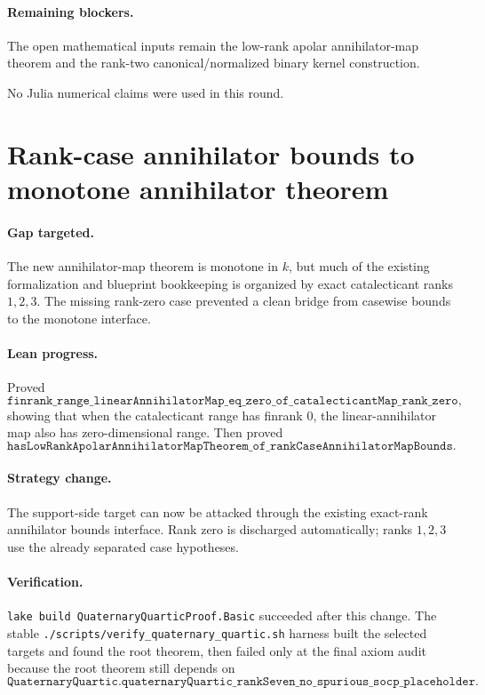 \documentclass[11pt]{article}
\begin{document}
\paragraph{Remaining blockers.}
The open mathematical inputs remain the low-rank apolar annihilator-map theorem
and the rank-two canonical/normalized binary kernel construction.

No Julia numerical claims were used in this round.

\section*{Rank-case annihilator bounds to monotone annihilator theorem}

\paragraph{Gap targeted.}
The new annihilator-map theorem is monotone in \(k\), but much of the existing
formalization and blueprint bookkeeping is organized by exact catalecticant
ranks \(1,2,3\).  The missing rank-zero case prevented a clean bridge from
casewise bounds to the monotone interface.

\paragraph{Lean progress.}
Proved
\[
\texttt{finrank\_range\_linearAnnihilatorMap\_eq\_zero\_of\_catalecticantMap\_rank\_zero},
\]
showing that when the catalecticant range has finrank \(0\), the
linear-annihilator map also has zero-dimensional range.  Then proved
\[
\texttt{hasLowRankApolarAnnihilatorMapTheorem\_of\_rankCaseAnnihilatorMapBounds}.
\]

\paragraph{Strategy change.}
The support-side target can now be attacked through the existing exact-rank
annihilator bounds interface.  Rank zero is discharged automatically; ranks
\(1,2,3\) use the already separated case hypotheses.

\paragraph{Verification.}
\texttt{lake build QuaternaryQuarticProof.Basic} succeeded after this change.
The stable \texttt{./scripts/verify\_quaternary\_quartic.sh} harness built the
selected targets and found the root theorem, then failed only at the final axiom
audit because the root theorem still depends on
\[
\texttt{QuaternaryQuartic.quaternaryQuartic\_rankSeven\_no\_spurious\_socp\_placeholder}.
\]
\end{document}
